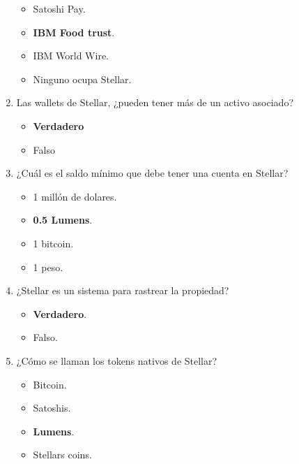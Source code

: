 \documentclass[a4paper,12pt]{/home/armando/Documentos/Cursos/LaTeX/Plantillas/lib/pub}
\begin{document}
\begin{enumerate}
	\begin{itemize}
		\item Satoshi Pay.
		\item \textbf{IBM Food trust}.
		\item IBM World Wire.
		\item Ninguno ocupa Stellar.
	\end{itemize}
	\item Las wallets de Stellar, ¿pueden tener más de un activo asociado?
	\begin{itemize}
		\item \textbf{Verdadero}
		\item Falso
	\end{itemize}
	\item ¿Cuál es el saldo mínimo que debe tener una cuenta en Stellar?
	\begin{itemize}
		\item 1 millón de dolares.
		\item \textbf{0.5 Lumens}.
		\item 1 bitcoin.
		\item 1 peso.
	\end{itemize}
	\item  ¿Stellar es un sistema para rastrear la propiedad?
	\begin{itemize}
		\item \textbf{Verdadero}.
		\item Falso.
	\end{itemize}
	\item ¿Cómo se llaman los tokens nativos de Stellar?
	\begin{itemize}
		\item Bitcoin.
		\item Satoshis.
		\item \textbf{Lumens}.
		\item Stellars coins.
	\end{itemize}
	\end{enumerate}
\end{document}
